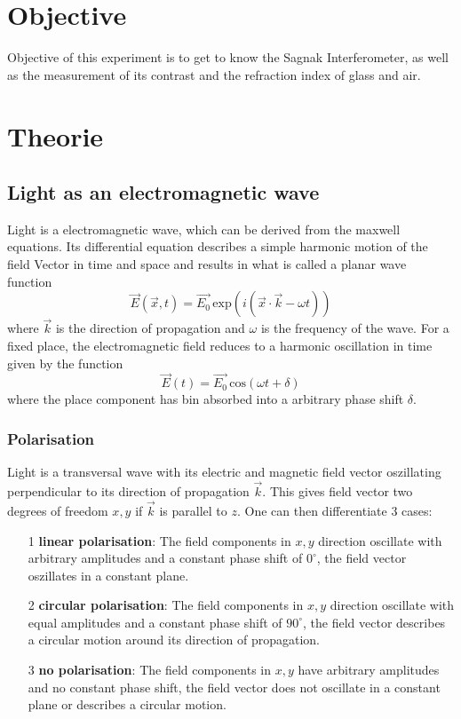 \section{Objective}
\label{sec:Zielsetzung}
    Objective of this experiment is to get to know the Sagnak Interferometer, as well as the measurement of its contrast and the refraction index of glass and air.
\section{Theorie}
\label{sec:Theorie}
\subsection{Light as an electromagnetic wave}
Light is a electromagnetic wave, which can be derived from the maxwell equations. Its differential equation describes a simple harmonic motion of the field Vector in time and space and results in 
what is called a planar wave function
\begin{equation}
    \vec{E}\left(\vec{x}, t\right) = \vec{E_0} \, \text{exp} \left(i \left(\vec{x} \cdot \vec{k} - \omega t\right)\right)
\end{equation}
where $\vec{k}$ is the direction of propagation and $\omega$ is the frequency of the wave.
For a fixed place, the electromagnetic field reduces to a harmonic oscillation in time given by the function
\begin{equation}
    \vec{E}\left( t\right) = \vec{E_0} \, \text{cos} \left(\omega t + \delta\right)
\end{equation}
where the place component has bin absorbed into a arbitrary phase shift $\delta$.
\subsubsection{Polarisation}
Light is a transversal wave with its electric and magnetic field vector oszillating perpendicular to its direction of propagation $\vec{k}$. This gives field vector two degrees of freedom $x,y$ if $\vec{k}$ is parallel to $z$.
One can then differentiate 3 cases:
\begin{itemize}
    \item[1] \textbf{linear polarisation}: The field components in $x,y$ direction oscillate with arbitrary amplitudes and a constant phase shift of $0^\circ$, the field vector oszillates in a constant plane.
    \item[2] \textbf{circular polarisation}: The field components in $x, y$ direction oscillate with equal amplitudes and a constant phase shift of $90^\circ$, the field vector describes a circular motion around its direction of propagation.
    \item[3] \textbf{no polarisation}: The field components in $x,y$ have arbitrary amplitudes and no constant phase shift, the field vector does not oscillate in a constant plane or describes a circular motion.
\end{itemize}

